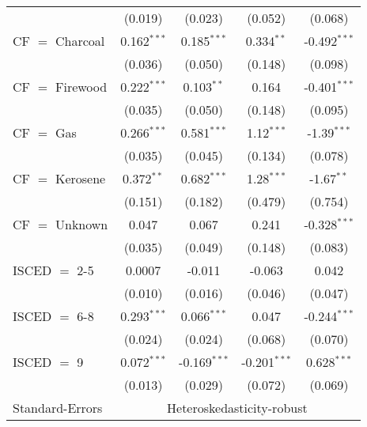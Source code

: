 \begin{table}[htbp!]
\begin{adjustbox}{width = 1\textwidth, max height = 0.95\textheight, center}
\begin{threeparttable}[b]
\begin{tabular}{lcccc}
                                 & (0.019)            & (0.023)            & (0.052)        & (0.068)\\   
            CF $=$ Charcoal      & 0.162$^{***}$      & 0.185$^{***}$      & 0.334$^{**}$   & -0.492$^{***}$\\   
                                 & (0.036)            & (0.050)            & (0.148)        & (0.098)\\   
            CF $=$ Firewood      & 0.222$^{***}$      & 0.103$^{**}$       & 0.164          & -0.401$^{***}$\\   
                                 & (0.035)            & (0.050)            & (0.148)        & (0.095)\\   
            CF $=$ Gas           & 0.266$^{***}$      & 0.581$^{***}$      & 1.12$^{***}$   & -1.39$^{***}$\\   
                                 & (0.035)            & (0.045)            & (0.134)        & (0.078)\\   
            CF $=$ Kerosene      & 0.372$^{**}$       & 0.682$^{***}$      & 1.28$^{***}$   & -1.67$^{**}$\\   
                                 & (0.151)            & (0.182)            & (0.479)        & (0.754)\\   
            CF $=$ Unknown       & 0.047              & 0.067              & 0.241          & -0.328$^{***}$\\   
                                 & (0.035)            & (0.049)            & (0.148)        & (0.083)\\   
            ISCED $=$ 2-5        & 0.0007             & -0.011             & -0.063         & 0.042\\   
                                 & (0.010)            & (0.016)            & (0.046)        & (0.047)\\   
            ISCED $=$ 6-8        & 0.293$^{***}$      & 0.066$^{***}$      & 0.047          & -0.244$^{***}$\\   
                                 & (0.024)            & (0.024)            & (0.068)        & (0.070)\\   
            ISCED $=$ 9          & 0.072$^{***}$      & -0.169$^{***}$     & -0.201$^{***}$ & 0.628$^{***}$\\   
                                 & (0.013)            & (0.029)            & (0.072)        & (0.069)\\   
            \midrule 
            Standard-Errors & \multicolumn{4}{c}{Heteroskedasticity-robust} \\ 

\end{tabular}
\end{threeparttable}
\end{adjustbox}
\end{table}
